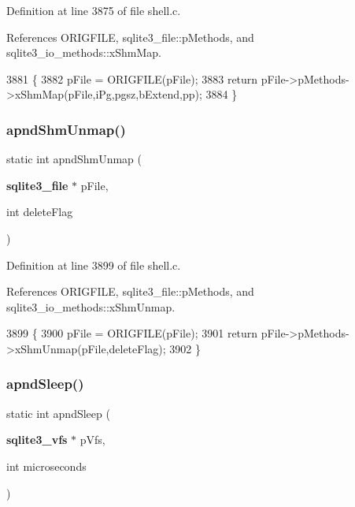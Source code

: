 Definition at line 3875 of file shell.\+c.



References O\+R\+I\+G\+F\+I\+LE, sqlite3\+\_\+file\+::p\+Methods, and sqlite3\+\_\+io\+\_\+methods\+::x\+Shm\+Map.


\begin{DoxyCode}
3881  \{
3882   pFile = ORIGFILE(pFile);
3883   \textcolor{keywordflow}{return} pFile->pMethods->xShmMap(pFile,iPg,pgsz,bExtend,pp);
3884 \}
\end{DoxyCode}
\mbox{\label{shell_8c_a490bad72b8b72757f952cbff75b72a77}} 
\subsubsection{apnd\+Shm\+Unmap()}
{\footnotesize\ttfamily static int apnd\+Shm\+Unmap (\begin{DoxyParamCaption}\item[{\textbf{ sqlite3\+\_\+file} $\ast$}]{p\+File,  }\item[{int}]{delete\+Flag }\end{DoxyParamCaption})\hspace{0.3cm}{\ttfamily [static]}}



Definition at line 3899 of file shell.\+c.



References O\+R\+I\+G\+F\+I\+LE, sqlite3\+\_\+file\+::p\+Methods, and sqlite3\+\_\+io\+\_\+methods\+::x\+Shm\+Unmap.


\begin{DoxyCode}
3899                                                             \{
3900   pFile = ORIGFILE(pFile);
3901   \textcolor{keywordflow}{return} pFile->pMethods->xShmUnmap(pFile,deleteFlag);
3902 \}
\end{DoxyCode}
\mbox{\label{shell_8c_a6498cf8468071fb7ddf481ea00fdcc24}} 
\subsubsection{apnd\+Sleep()}
{\footnotesize\ttfamily static int apnd\+Sleep (\begin{DoxyParamCaption}\item[{\textbf{ sqlite3\+\_\+vfs} $\ast$}]{p\+Vfs,  }\item[{int}]{microseconds }\end{DoxyParamCaption})\hspace{0.3cm}{\ttfamily [static]}}



